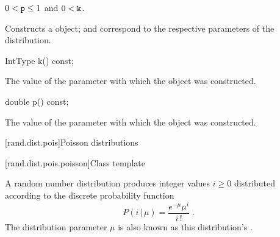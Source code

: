 \begin{itemdescr}
\pnum\requires
 $0 < \texttt{p} \leq 1$
 and $0 < \texttt{k} $.

\pnum\effects Constructs a  object;
  and 
 correspond to the respective parameters of the distribution.
\end{itemdescr}

%
%
\begin{itemdecl}
IntType k() const;
\end{itemdecl}

\begin{itemdescr}
\pnum\returns The value of the  parameter
 with which the object was constructed.
\end{itemdescr}

%
%
\begin{itemdecl}
double p() const;
\end{itemdecl}

\begin{itemdescr}
\pnum\returns The value of the  parameter
 with which the object was constructed.
\end{itemdescr}%
%



[rand.dist.pois]{Poisson distributions}%
%


[rand.dist.pois.poisson]{Class template }%
%

\pnum
A  random number distribution
produces integer values $ i \geq 0 $
distributed according to
the discrete probability function
%
\[%
 P(i\,|\,\mu)
      = \frac{ e^{-\mu} \mu^{i} }
             { i\,! }
\; \mbox{.}
\]
The distribution parameter $\mu$
is also known as this distribution's %
%
%
.

